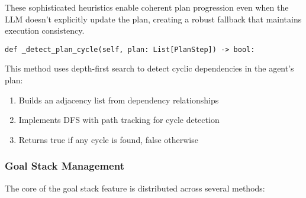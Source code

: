 \documentclass[12pt,a4paper]{article}
\begin{document}
These sophisticated heuristics enable coherent plan progression even when the LLM doesn't explicitly update the plan, creating a robust fallback that maintains execution consistency.

\begin{pageablecode}
\begin{verbatim}
def _detect_plan_cycle(self, plan: List[PlanStep]) -> bool:
\end{verbatim}
\end{pageablecode}
This method uses depth-first search to detect cyclic dependencies in the agent's plan:
\begin{enumerate}[label=\arabic*.]
    \item Builds an adjacency list from dependency relationships
    \item Implements DFS with path tracking for cycle detection
    \item Returns true if any cycle is found, false otherwise
\end{enumerate}

\subsubsection*{Goal Stack Management}

The core of the goal stack feature is distributed across several methods:
\end{document}
